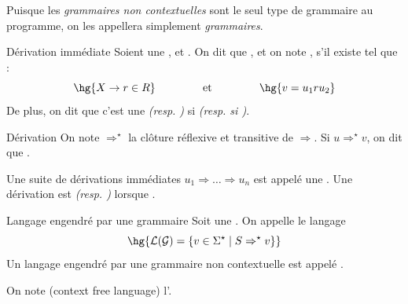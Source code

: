 \documentclass[a4paper,french,bookmarks]{book}
\begin{document}
    Puisque les \emph{grammaires non contextuelles} sont le seul type de grammaire au programme, on les appellera simplement \emph{grammaires}.
    
    \begin{definition}{Dérivation immédiate}{}
        Soient  une ,  et . On dit que , et on note , s'il existe  tel que :
        \[ \hg{X \rightarrow r \in R} \qquad\qquad\et\qquad\qquad \hg{v = u_1 r u_2}\]
        De plus, on dit que c'est une  \emph{(resp. )} si  \emph{(resp. si )}.
    \end{definition}
    
    \begin{definition}{Dérivation}{}
        On note $\Rightarrow^\star$ la clôture réflexive et transitive de $\Rightarrow$. Si $u \Rightarrow^\star v$, on dit que .
        
        Une suite de dérivations immédiates $u_1 \Rightarrow \dots \Rightarrow u_n$ est appelé une .
        Une dérivation est  \emph{(resp. )} lorsque  .
    \end{definition}
    
    \begin{definition}{Langage engendré par une grammaire}{}
        Soit  une . On appelle  le langage 
        \[ \hg{\bcL\p{\bcG} = \ens{v \in \Sigma^\star \enstq S \Rightarrow^\star v }}\]
        Un langage engendré par une grammaire non contextuelle est appelé .
    \end{definition}
    \begin{notation}
        On note \hg{$\CFL_\Sigma$} (context free language) l'.  
    \end{notation}
    
\end{document}
